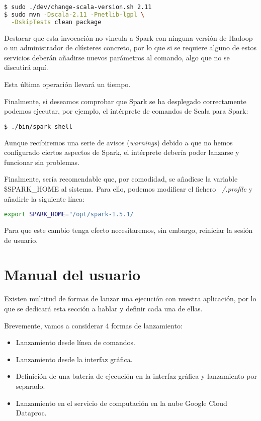 \begin{lstlisting}[language=bash]
$ sudo ./dev/change-scala-version.sh 2.11
$ sudo mvn -Dscala-2.11 -Pnetlib-lgpl \
  -DskipTests clean package
\end{lstlisting}

Destacar que esta invocación no vincula a Spark con ninguna versión de Hadoop o un administrador de clústeres concreto, por lo que si se requiere alguno de estos servicios deberán añadirse nuevos parámetros al comando, algo que no se discutirá aquí.

Esta última operación llevará un tiempo. 

Finalmente, si deseamos comprobar que Spark se ha desplegado correctamente podemos ejecutar, por ejemplo, el intérprete de comandos de Scala para Spark:

\begin{lstlisting}[language=bash]
$ ./bin/spark-shell
\end{lstlisting}

Aunque recibiremos una serie de avisos (\textit{warnings}) debido a que no hemos configurado ciertos aspectos de Spark, el intérprete debería poder lanzarse y funcionar sin problemas.

Finalmente, sería recomendable que, por comodidad, se añadiese la variable \$SPARK\_HOME al sistema. Para ello, podemos modificar el fichero \textit{~/.profile} y añadirle la siguiente línea:

\begin{lstlisting}[language=bash]
export SPARK_HOME="/opt/spark-1.5.1/
\end{lstlisting}

Para que este cambio tenga efecto necesitaremos, sin embargo, reiniciar la sesión de usuario.

\section{Manual del usuario}\label{sec:manualUsuario}

Existen multitud de formas de lanzar una ejecución con nuestra aplicación, por lo que se dedicará esta sección a hablar y definir cada una de ellas.

Brevemente, vamos a considerar 4 formas de lanzamiento:

\begin{itemize}
	\item Lanzamiento desde línea de comandos.
	\item Lanzamiento desde la interfaz gráfica.
	\item Definición de una batería de ejecución en la interfaz gráfica y lanzamiento por separado.
	\item Lanzamiento en el servicio de computación en la nube Google Cloud Dataproc.
\end{itemize}

